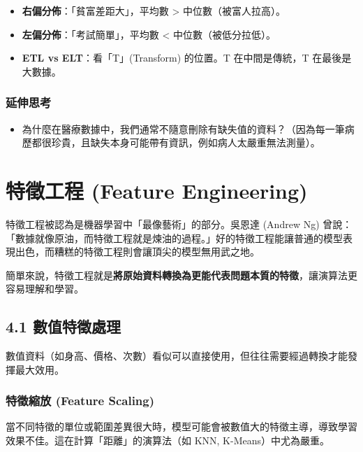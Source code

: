 \documentclass[
  letterpaper,
  DIV=11,
  numbers=noendperiod]{scrreprt}
\providecommand{\tightlist}{%
  \setlength{\itemsep}{0pt}\setlength{\parskip}{0pt}}
\begin{document}
\begin{itemize}
\tightlist
\item
  \textbf{右偏分佈}：「貧富差距大」，平均數 \textgreater{}
  中位數（被富人拉高）。
\item
  \textbf{左偏分佈}：「考試簡單」，平均數 \textless{}
  中位數（被低分拉低）。
\item
  \textbf{ETL vs ELT}：看「T」(Transform) 的位置。T 在中間是傳統，T
  在最後是大數據。
\end{itemize}

\section{延伸思考}\label{ux5ef6ux4f38ux601dux8003-2}

\begin{itemize}
\tightlist
\item
  為什麼在醫療數據中，我們通常不隨意刪除有缺失值的資料？（因為每一筆病歷都很珍貴，且缺失本身可能帶有資訊，例如病人太嚴重無法測量）。
\end{itemize}

\part{特徵工程 (Feature
Engineering)}\label{ux7279ux5fb5ux5de5ux7a0b-feature-engineering}

特徵工程被認為是機器學習中「最像藝術」的部分。吳恩達 (Andrew Ng)
曾說：「數據就像原油，而特徵工程就是煉油的過程。」好的特徵工程能讓普通的模型表現出色，而糟糕的特徵工程則會讓頂尖的模型無用武之地。

簡單來說，特徵工程就是\textbf{將原始資料轉換為更能代表問題本質的特徵}，讓演算法更容易理解和學習。

\chapter{4.1 數值特徵處理}\label{sec-numerical-features}

數值資料（如身高、價格、次數）看似可以直接使用，但往往需要經過轉換才能發揮最大效用。

\section{特徵縮放 (Feature Scaling)}\label{sec-feature-scaling}

當不同特徵的單位或範圍差異很大時，模型可能會被數值大的特徵主導，導致學習效果不佳。這在計算「距離」的演算法（如
KNN, K-Means）中尤為嚴重。
\end{document}
